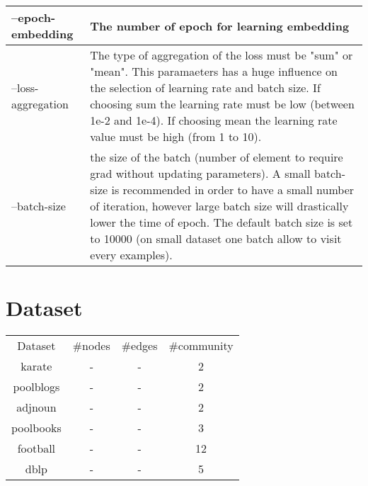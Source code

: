 \documentclass{article}
\begin{document}
\begin{table}
\begin{tabular}{l|p{10cm}}
                --epoch-embedding & The number of epoch for learning embedding\\
                \hline
                \hline
                --loss-aggregation & The type of aggregation of the loss must be "sum" or "mean". This paramaeters has a huge influence on the selection of learning rate and batch size. If choosing sum the learning rate must be low (between 1e-2 and 1e-4). If choosing mean the learning rate value must be high (from 1 to 10). \\
                --batch-size & the size of the batch (number of element to require grad without updating parameters). A small batch-size is recommended in order to have a small number of iteration, however large batch size will drastically lower the time of epoch. The default batch size is set to 10000 (on small dataset one batch allow to visit every examples). \\
                \hline


            \end{tabular}
        \end{table}
    \section{Dataset}
    \begin{table}
        \begin{tabular}{c|c|c|c}
            Dataset & \#nodes & \#edges &\#community \\
            karate & - & - & 2 \\
            poolblogs & -  & - & 2\\
            adjnoun & - & -& 2 \\
            poolbooks & - & - & 3\\
            football & - & - &  12 \\
            dblp & - & - & 5 \\
            
        \end{tabular}
    \end{table}
\end{document}

